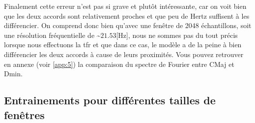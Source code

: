 Finalement cette erreur n'est pas si grave et plutôt intéressante, car on voit bien que les deux accords sont relativement proches et que peu de Hertz suffisent à les différencier. On comprend donc bien qu'avec une fenêtre de 2048 échantillons, soit une résolution fréquentielle de \textasciitilde$21.53$[Hz], nous ne sommes pas du tout précis lorsque nous effectuons la \gls{tfr} et que dans ce cas, le modèle a de la peine à bien différencier les deux accords à cause de leurs proximités. Vous pouvez retrouver en annexe (voir \autoref{app:5}) la comparaison du spectre de Fourier entre C\sh Maj et Dmin.

\subsection{Entrainements pour différentes tailles de fenêtres}

\begin{table}[H]
\end{table}

